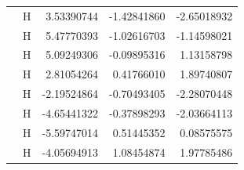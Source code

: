 \begin{longtable}{llrrr}
 & H &  3.53390744 & -1.42841860 & -2.65018932 \\
 & H &  5.47770393 & -1.02616703 & -1.14598021 \\
 & H &  5.09249306 & -0.09895316 &  1.13158798 \\
 & H &  2.81054264 &  0.41766010 &  1.89740807 \\
 & H & -2.19524864 & -0.70493405 & -2.28070448 \\
 & H & -4.65441322 & -0.37898293 & -2.03664113 \\
 & H & -5.59747014 &  0.51445352 &  0.08575575 \\
 & H & -4.05694913 &  1.08454874 &  1.97785486 \\
\end{longtable}
